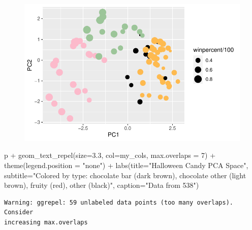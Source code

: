 \documentclass[
  letterpaper,
  DIV=11,
  numbers=noendperiod]{scrartcl}
\newenvironment{Shaded}{\begin{snugshade}}{\end{snugshade}}
\newcommand{\AttributeTok}[1]{\textcolor[rgb]{0.40,0.45,0.13}{#1}}
\newcommand{\DecValTok}[1]{\textcolor[rgb]{0.68,0.00,0.00}{#1}}
\newcommand{\FloatTok}[1]{\textcolor[rgb]{0.68,0.00,0.00}{#1}}
\newcommand{\FunctionTok}[1]{\textcolor[rgb]{0.28,0.35,0.67}{#1}}
\newcommand{\NormalTok}[1]{\textcolor[rgb]{0.00,0.23,0.31}{#1}}
\newcommand{\SpecialCharTok}[1]{\textcolor[rgb]{0.37,0.37,0.37}{#1}}
\newcommand{\StringTok}[1]{\textcolor[rgb]{0.13,0.47,0.30}{#1}}
\begin{document}
\begin{figure}[H]

{\centering \includegraphics{class09_files/figure-pdf/unnamed-chunk-30-1.pdf}

}

\end{figure}

\begin{Shaded}
\begin{Highlighting}[]
\NormalTok{p }\SpecialCharTok{+} \FunctionTok{geom\_text\_repel}\NormalTok{(}\AttributeTok{size=}\FloatTok{3.3}\NormalTok{, }\AttributeTok{col=}\NormalTok{my\_cols, }\AttributeTok{max.overlaps =} \DecValTok{7}\NormalTok{)  }\SpecialCharTok{+} 
  \FunctionTok{theme}\NormalTok{(}\AttributeTok{legend.position =} \StringTok{"none"}\NormalTok{) }\SpecialCharTok{+}
  \FunctionTok{labs}\NormalTok{(}\AttributeTok{title=}\StringTok{"Halloween Candy PCA Space"}\NormalTok{,}
       \AttributeTok{subtitle=}\StringTok{"Colored by type: chocolate bar (dark brown), chocolate other (light brown), fruity (red), other (black)"}\NormalTok{,}
       \AttributeTok{caption=}\StringTok{"Data from 538"}\NormalTok{)}
\end{Highlighting}
\end{Shaded}

\begin{verbatim}
Warning: ggrepel: 59 unlabeled data points (too many overlaps). Consider
increasing max.overlaps
\end{verbatim}
\end{document}

